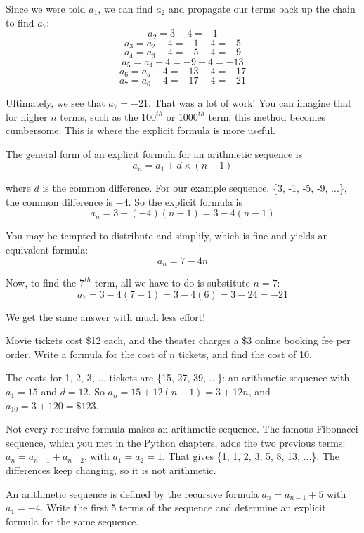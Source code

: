 Since we were told $a_1$, we can find $a_2$ and propagate our terms 
back up the chain to find $a_7$:
$$a_2 = 3 - 4 = -1$$
$$a_3 = a_2 - 4 = -1 - 4 = -5$$
$$a_4 = a_3 - 4 = -5 - 4 = -9$$
$$a_5 = a_4 - 4 = -9 - 4 = -13$$
$$a_6 = a_5 - 4 = -13 - 4 = -17$$
$$a_7 = a_6 - 4 = -17 - 4 = -21$$

Ultimately, we see that $a_7 = -21$. That was a lot of work! You can 
imagine that for higher $n$ terms, such as the $100^{th}$ or 
$1000^{th}$ term, this method becomes cumbersome. This is where the 
explicit formula is more useful.

The general form of an explicit formula for an arithmetic sequence is 
$$a_n = a_1 + d \times (n-1)$$

where $d$ is the common difference. For our example sequence, \{3, -1, 
-5, -9, ...\}, the common difference is $-4$. So the explicit formula 
is
$$a_n = 3 + (-4)(n-1) = 3 - 4(n-1)$$

You may be tempted to distribute and simplify, which is fine and 
yields an equivalent formula:
$$a_n = 7-4n$$

Now, to find the $7^{th}$ term, all we have to do is substitute $n=7$:
$$a_7 = 3 - 4(7 - 1) = 3 - 4(6) = 3 - 24 = -21$$

We get the same answer with much less effort!

\begin{Worked}
\begin{Problem}
Movie tickets cost \$12 each, and the theater
charges a \$3 online booking fee per order. Write a formula for the cost of
$n$ tickets, and find the cost of 10.
\end{Problem}
\begin{Solution}
The costs for 1, 2, 3, $\ldots$ tickets are
\{15, 27, 39, $\ldots$\}: an arithmetic sequence with $a_1 = 15$ and
$d = 12$. So $a_n = 15 + 12(n - 1) = 3 + 12n$, and $a_{10} = 3 + 120 =
\$123$.
\end{Solution}
\end{Worked}

Not every recursive formula makes an arithmetic sequence. The famous
Fibonacci sequence, which you met in the Python
chapters, adds the two previous terms: $a_n = a_{n-1} + a_{n-2}$, with
$a_1 = a_2 = 1$. That gives \{1, 1, 2, 3, 5, 8, 13, $\ldots$\}. The
differences keep changing, so it is not arithmetic.

\begin{Exercise}[label=seq2]
An arithmetic sequence is defined by the recursive formula $a_n = 
a_{n-1} + 5$ with $a_1 = -4$. Write the first 5 terms of the sequence 
and determine an explicit formula for the same sequence.
\end{Exercise}


